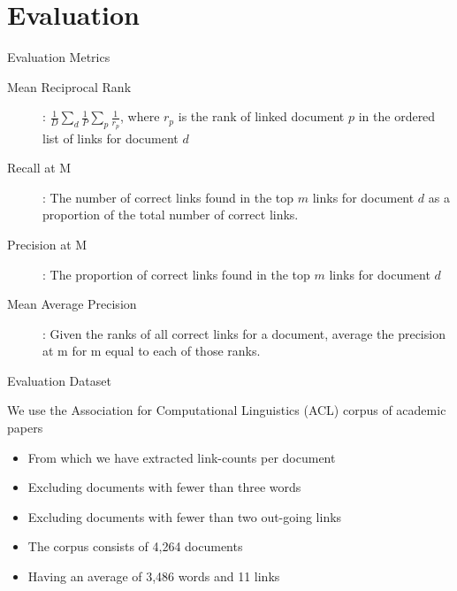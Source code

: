 \documentclass[xcolor=dvipsnames]{beamer}
\begin{document}

\section{Evaluation}
\begin{frame}{Evaluation Metrics}

\begin{description}
\item[Mean Reciprocal Rank]: $\frac{1}{D} \sum_d \frac{1}{P} \sum_p \frac{1}{r_p}$, where $r_p$ is the rank of linked document $p$ in the ordered list of links for document $d$ 
\item[Recall at M]: The number of correct links found in the top $m$ links for document $d$ as a proportion of the total number of correct links. 
\item[Precision at M]: The proportion of correct links found in the top $m$ links for document $d$
\item[Mean Average Precision]: Given the ranks of all correct links for a document, average the precision at m for m equal to each of those ranks. 
\end{description}

\end{frame}

\begin{frame}{Evaluation Dataset}

We use the Association for Computational Linguistics (ACL) corpus of academic papers

\begin{itemize}
    \item From which we have extracted link-counts per document
    \item Excluding documents with fewer than three words
    \item Excluding documents with fewer than two out-going links
    \item The corpus consists of 4,264 documents
    \item Having an average of 3,486 words and 11 links
\end{itemize}


\end{frame}
\end{document}
